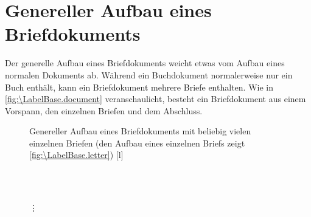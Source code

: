 \section{Genereller Aufbau eines Briefdokuments}
\BeginIndexGroup
{}

Der generelle Aufbau eines Briefdokuments weicht etwas vom Aufbau eines
normalen Dokuments ab. Während ein Buchdokument normalerweise nur ein Buch
enthält, kann ein Briefdokument mehrere Briefe enthalten.  Wie in
\autoref{fig:\LabelBase.document} veranschaulicht, besteht ein
Briefdokument aus einem Vorspann, den einzelnen Briefen und dem Abschluss.

\begin{figure}
  \setcapindent{0pt}%
  \begin{captionbeside}{%
      Genereller Aufbau eines Briefdokuments mit
      beliebig vielen einzelnen Briefen (den Aufbau eines einzelnen
      Briefs zeigt \autoref{fig:\LabelBase.letter})%
      \label{fig:\LabelBase.document}}[l]
    \begin{minipage}[b]{.667\linewidth}
      \centering\small\setlength{\fboxsep}{1.5ex}%
      \addtolength{\linewidth}{-\dimexpr2\fboxrule+2\fboxsep\relax}%
      \setlength{\topsep}{.5\topsep}%
      \\[1pt]
      \\[2pt]
      \parbox{\linewidth}{\raggedright\vspace{-.5ex}\vdots\vspace{1ex}}\\
      \\[\dimexpr\fboxsep+\fboxrule\relax]
    \end{minipage}
  \end{captionbeside}
\end{figure}

